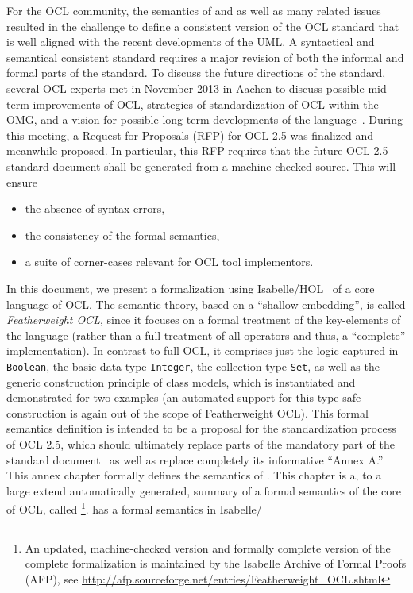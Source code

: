 For the OCL community, the semantics of  and
 as well as many related issues resulted in the
challenge to define a consistent version of the OCL standard that is
well aligned with the recent developments of the UML\@. A syntactical
and semantical consistent standard requires a major revision of both
the informal and formal parts of the standard. To discuss the future
directions of the standard, several OCL experts met in November 2013
in Aachen to discuss possible mid-term improvements of OCL, strategies
of standardization of OCL within the OMG, and a vision for possible
long-term developments of the
language~\cite{brucker.ea:summary-aachen:2013}. During this meeting, a
Request for Proposals (RFP) for OCL 2.5 was finalized and meanwhile
proposed. In particular, this RFP requires that the future OCL 2.5
standard document shall be generated from a machine-checked
source. This will ensure
\begin{itemize}
\item the absence of syntax errors,
\item the consistency of the formal semantics,
\item a suite of corner-cases relevant for OCL tool implementors.
\end{itemize}

In this document, we present a formalization using
Isabelle/HOL~\cite{nipkow.ea:isabelle:2002} of a core language of
OCL\@. The semantic theory, based on a ``shallow embedding'', is
called \emph{Featherweight OCL}, since it focuses on a formal
treatment of the key-elements of the language (rather than a full
treatment of all operators and thus, a ``complete''
implementation). In contrast to full OCL, it comprises just the logic
captured in \verb+Boolean+, the basic data type \verb+Integer+, the
collection type \verb+Set+, as well as the generic construction
principle of class models, which is instantiated and demonstrated for
two examples (an automated support for this type-safe construction is
again out of the scope of Featherweight OCL).  This formal semantics
definition is intended to be a proposal for the standardization
process of OCL 2.5, which should ultimately replace parts of the
mandatory part of the standard document~\cite{omg:ocl:2012} as well as
replace completely its informative ``Annex A.''
\endisatagafp
\isatagannexa
This annex chapter formally defines the semantics of \OCL. This
chapter is a, to a large extend automatically generated, summary of a
formal semantics of the core of OCL, called \FOCL\footnote{An updated,
  machine-checked version and formally complete version of the
  complete formalization is maintained by the Isabelle Archive of
  Formal Proofs (AFP), see
  \url{http://afp.sourceforge.net/entries/Featherweight_OCL.shtml}}. \FOCL
has a formal semantics in Isabelle/\HOL~\cite{nipkow.ea:isabelle:2002}
\endisatagannexa

